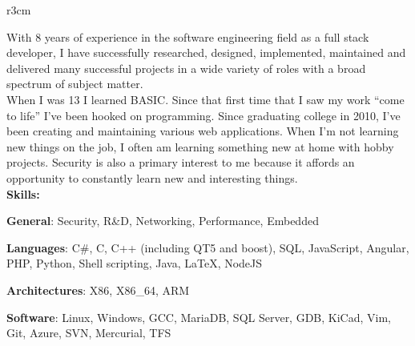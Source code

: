\documentclass[]{SBResume}
\begin{document}
\makeheader


\begin{resume}
  
  \begin{resumetext}
    \begin{wrapfigure}{r}{3cm}
    \insertheadshot
    \end{wrapfigure}
    With 8 years of experience in the software engineering 
    field as a full stack developer, I have successfully researched, designed, 
    implemented, maintained and delivered many successful
    projects in a wide variety of roles with a broad spectrum of
    subject matter.\\
    
	When I was 13 I learned BASIC. Since that first time that I saw my work “come to life”
	I’ve been hooked on programming. Since graduating college in 2010, I’ve been creating 
	and maintaining various web applications. When I’m not learning new things on the job,
	I often am learning something new at home with hobby projects. Security is also a 
	primary interest to me because it affords an opportunity to
	constantly learn new and interesting things.\\
    
    \textbf{Skills:}
    \begin{resumeitemize2}
    \item{\textbf{General}: Security, R\&D, Networking, Performance, Embedded}
    \item{\textbf{Languages}: C\#, C, C++ (including QT5 and boost), SQL, JavaScript, Angular, PHP, Python, Shell scripting, Java, \LaTeX, NodeJS}
    \item{\textbf{Architectures}: X86, X86\_64, ARM}
    \item{\textbf{Software}: Linux, Windows, GCC, MariaDB, SQL Server, GDB, KiCad, Vim, Git, Azure, SVN, Mercurial, TFS}
    \end{resumeitemize2}
    

\end{resumetext}
\end{resume}
\end{document}

